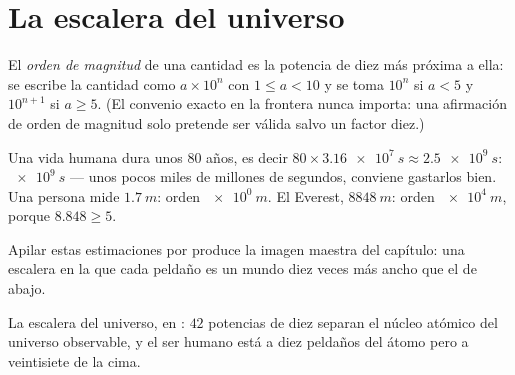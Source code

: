 \section{La escalera del universo}

\begin{definition}\label{def:g10:orders-of-magnitude:oom}
El \emph{orden de magnitud} de una cantidad es
la potencia de diez más próxima a ella: se escribe la cantidad como
$a \times 10^{n}$ con $1 \leq a < 10$ y se toma $10^{n}$ si $a < 5$ y
$10^{n+1}$ si $a \geq 5$. (El convenio exacto en la frontera nunca
importa: una afirmación de orden de magnitud solo pretende ser válida
salvo un factor diez.)
\end{definition}

\begin{example}\label{ex:g10:orders-of-magnitude:oom}
Una vida humana dura unos $80$ años, es decir
$80 \times \qty{3.16e7}{s} \approx \qty{2.5e9}{s}$: 
$\qty{e9}{s}$ --- unos pocos miles de millones de segundos, conviene
gastarlos bien. Una persona mide $\qty{1.7}{m}$: orden $\qty{e0}{m}$. El
Everest, $\qty{8848}{m}$: orden $\qty{e4}{m}$, porque $8.848 \geq 5$.
\end{example}

Apilar estas estimaciones por  produce la imagen maestra del
capítulo: una escalera en la que cada peldaño es un mundo diez veces más
ancho que el de abajo.

\begin{omfigure}

{\small La escalera del universo, en : $42$ potencias de diez
separan el núcleo atómico del universo observable, y el ser humano está
a diez peldaños del átomo pero a veintisiete de la cima.}
\end{omfigure}

